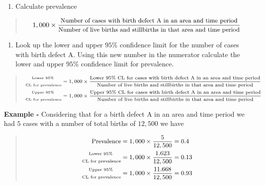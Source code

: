 \documentclass[
]{krantz}
\providecommand{\tightlist}{%
  \setlength{\itemsep}{0pt}\setlength{\parskip}{0pt}}
\begin{document}
\begin{enumerate}
\def\labelenumi{\arabic{enumi}.}
\tightlist
\item
  Calculate prevalence
\end{enumerate}

\begin{quote}
\[\small{
1,000 \times \dfrac{\text{Number of cases with birth defect A in an area and time period}}{\text{Number of live births and stillbirths in that area and time period}}
}\]
\end{quote}

\begin{enumerate}
\def\labelenumi{\arabic{enumi}.}
\setcounter{enumi}{1}
\tightlist
\item
  Look up the lower and upper \(95\%\) confidence limit for the number of cases with birth defect A. Using this new number in the numerator calculate the lower and upper \(95\%\) confidence limit for prevalence.
\end{enumerate}

\begin{quote}
\[
\scriptsize
\begin{aligned}
\substack{\text{Lower } 95\% \\ \\ \text{ CL for prevalence}} &= 1,000 \times \dfrac{\text{Lower } 95\% \text{ CL for cases with birth defect A in an area and time period}}{\text{Number of live births and stillbirths in that area and time period}}\\
\substack{\text{Upper } 95\% \\ \\ \text{ CL for prevalence}} &= 1,000 \times \dfrac{\text{Upper } 95\% \text{ CL for cases with birth defect A in an area and time period}}{\text{Number of live births and stillbirths in that area and time period}} 
\end{aligned}
\]
\end{quote}

\textbf{Example -} Considering that for a birth defect A in an area and time period we had \(5\) cases with a number of total births of \(12,500\) we have

\begin{quote}
\[
\small
\begin{aligned}
\text{Prevalence} &= 1,000 \times \dfrac{5}{12,500} = 0.4  \\
\substack{\text{Lower } 95\% \\ \\ \text{ CL for prevalence}} &= 1,000 \times \dfrac{1.623}{12,500} = 0.13 \\
\substack{\text{Upper } 95\% \\ \\\text{ CL for prevalence}} &= 1,000 \times \dfrac{11.668}{12,500} = 0.93 
\end{aligned}
\]
\end{quote}
\end{document}
